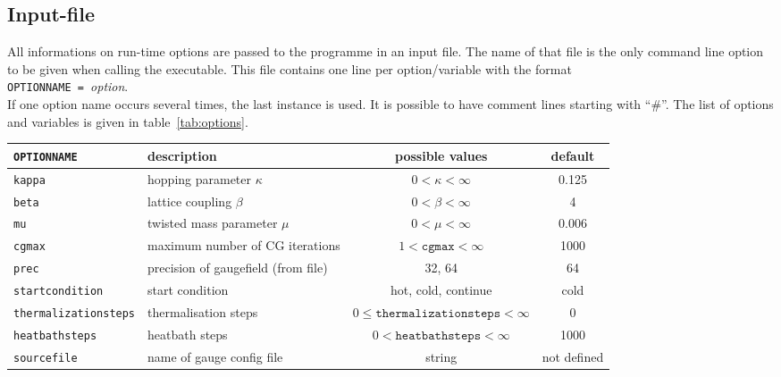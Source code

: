 \subsection{Input-file}
All informations on run-time options are passed to the programme in an input file. The name of that file is the only command line option to be given when calling the executable. This file contains one line per option/variable with the format\\
\verb+OPTIONNAME = +\textit{option}.\\
If one option name occurs several times, the last instance is used. It is possible to have comment lines starting with ``\#''.
The list of options and variables is given in table~\ref{tab:options}.

\begin{sidewaystable}
\begin{tabular}{llcc}
\verb+OPTIONNAME+ & description                        & possible values              & default \\
\hline
\verb+kappa+      & hopping parameter $\kappa$         & $0<\kappa<\infty$            & 0.125 \\
\verb+beta+       & lattice coupling $\beta$           & $0<\beta<\infty$             & 4 \\
\verb+mu+         & twisted mass parameter $\mu$       & $0<\mu<\infty$               & 0.006 \\
\verb+cgmax+      & maximum number of CG iterations    & $1<\texttt{cgmax}<\infty$    & 1000 \\
\verb+prec+       & precision of gaugefield (from file)& 32, 64                       & 64 \\
\verb+startcondition+ & start condition                & hot, cold, continue          & cold \\
\verb+thermalizationsteps+ & thermalisation steps      & $0\le\texttt{thermalizationsteps}<\infty$ & 0 \\
\verb+heatbathsteps+  & heatbath steps                 & $0<\texttt{heatbathsteps}<\infty$ & 1000 \\
\verb+sourcefile+  & name of gauge config file         & string                       &  not defined
\end{tabular}
\caption{List of all possible options and variables that can be passed to the programme in the input file.} \label{tab:options}
\end{sidewaystable}

